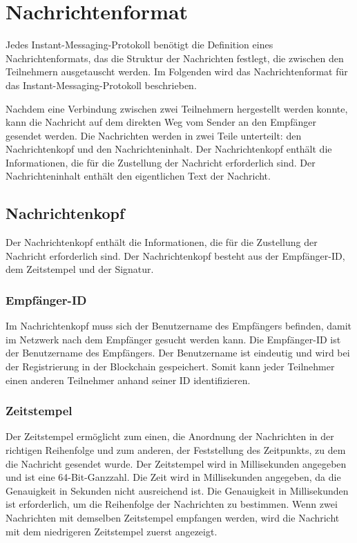\section{Nachrichtenformat}
\label{sec:nachrichtenformat}

Jedes Instant-Messaging-Protokoll benötigt die Definition eines Nachrichtenformats, das die Struktur der Nachrichten festlegt, die zwischen den Teilnehmern ausgetauscht werden. Im Folgenden wird das Nachrichtenformat für das Instant-Messaging-Protokoll beschrieben. 

Nachdem eine Verbindung zwischen zwei Teilnehmern hergestellt werden konnte, kann die Nachricht auf dem direkten Weg vom Sender an den Empfänger gesendet werden. Die Nachrichten werden in zwei Teile unterteilt: den Nachrichtenkopf und den Nachrichteninhalt. Der Nachrichtenkopf enthält die Informationen, die für die Zustellung der Nachricht erforderlich sind. Der Nachrichteninhalt enthält den eigentlichen Text der Nachricht.

\subsection{Nachrichtenkopf}
\label{subsec:nachrichtenkopf}

Der Nachrichtenkopf enthält die Informationen, die für die Zustellung der Nachricht erforderlich sind. Der Nachrichtenkopf besteht aus der Empfänger-ID, dem Zeitstempel und der Signatur.

\subsubsection{Empfänger-ID}
\label{subsubsec:empfaenger-id}


Im Nachrichtenkopf muss sich der Benutzername des Empfängers befinden, damit im Netzwerk nach dem Empfänger gesucht werden kann. Die Empfänger-ID ist der Benutzername des Empfängers. Der Benutzername ist eindeutig und wird bei der Registrierung in der Blockchain gespeichert. Somit kann jeder Teilnehmer einen anderen Teilnehmer anhand seiner ID identifizieren.

\subsubsection{Zeitstempel}
\label{subsubsec:zeitstempel}

Der Zeitstempel ermöglicht zum einen, die Anordnung der Nachrichten in der richtigen Reihenfolge und zum anderen, der Feststellung des Zeitpunkts, zu dem die Nachricht gesendet wurde. Der Zeitstempel wird in Millisekunden angegeben und ist eine 64-Bit-Ganzzahl. Die Zeit wird in Millisekunden angegeben, da die Genauigkeit in Sekunden nicht ausreichend ist. Die Genauigkeit in Millisekunden ist erforderlich, um die Reihenfolge der Nachrichten zu bestimmen. Wenn zwei Nachrichten mit demselben Zeitstempel empfangen werden, wird die Nachricht mit dem niedrigeren Zeitstempel zuerst angezeigt.

